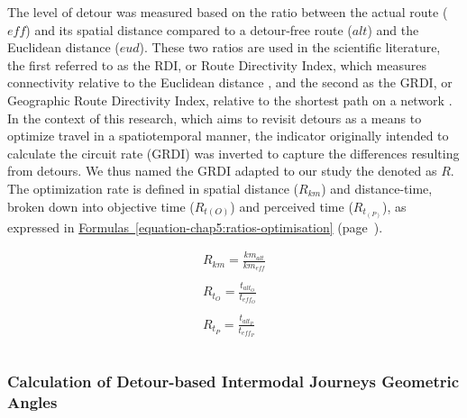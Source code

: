 \begin{refsegment}
The level of detour was measured based on the ratio between the actual route (\(eff\)) and its spatial distance compared to a detour-free route (\(alt\)) and the Euclidean distance (\(eud\)). These two ratios are used in the scientific literature, the first referred to as the \acrfull{RDI}, or Route Directivity Index, which measures connectivity relative to the Euclidean distance \textcolor{blue}{\autocite[193]{park_why_2019}}, and the second as the \acrfull{GRDI}, or Geographic Route Directivity Index, relative to the shortest path on a network \textcolor{blue}{\autocite[126]{ciscal-terry_analysis_2016}}. In the context of this research, which aims to revisit detours as a means to optimize travel in a spatiotemporal manner, the indicator originally intended to calculate the circuit rate (\acrshort{GRDI}) was inverted to capture the differences resulting from detours. We thus named the \acrshort{GRDI} adapted to our study the  denoted as \(R\). The optimization rate is defined in spatial distance (\(R_{km}\)) and distance-time, broken down into objective time (\(R_{t{(O)}}\)) and perceived time (\(R_{t_{(P)}}\)), as expressed in \hyperref[equation-chap5:ratios-optimisation]{Formulas~\ref{equation-chap5:ratios-optimisation}} (page~\pageref{equation-chap5:ratios-optimisation}).%

\begin{equation}
\label{equation-chap5:ratios-optimisation}
\begin{array}{lclcl}
\displaystyle R_{km} = \displaystyle\frac{km_{alt}}{km_{eff}}\\\\
\displaystyle R_{t_O} = \displaystyle\frac{t_{alt_O}}{t_{eff_O}}\\\\
\displaystyle R_{t_P} = \displaystyle\frac{t_{alt_P}}{t_{eff_P}}\\\\
\end{array}
\end{equation}

\subsubsection*{Calculation of Detour-based Intermodal Journeys Geometric Angles
    \label{chap5:calcul-angles-detours}
}


\end{refsegment}
